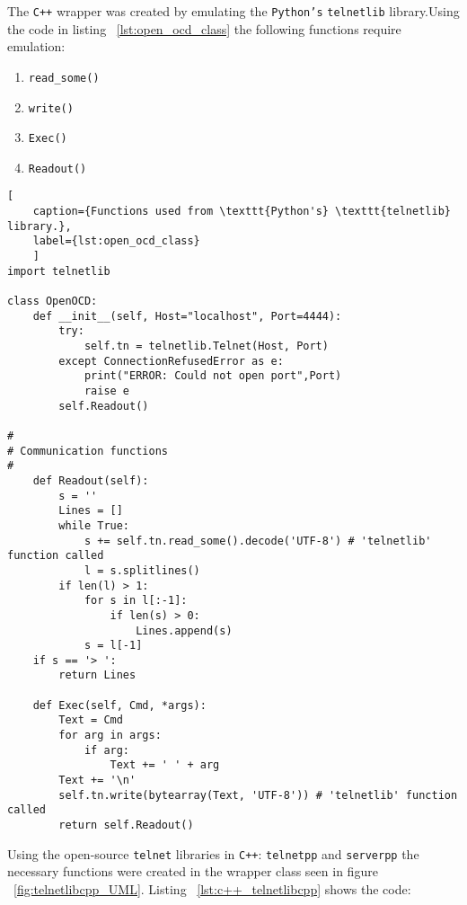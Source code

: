 The \texttt{C++} wrapper was created by emulating the \texttt{Python's} \texttt{telnetlib} library.Using the code in listing ~\ref{lst:open_ocd_class} the following functions require emulation:

\begin{enumerate}
	\item \texttt{read\_some()}
	\item \texttt{write()}
	\item \texttt{Exec()}
	\item \texttt{Readout()}
\end{enumerate}


\begin{lstlisting}[
	caption={Functions used from \texttt{Python's} \texttt{telnetlib} library.},
	label={lst:open_ocd_class}
	]
import telnetlib

class OpenOCD:
	def __init__(self, Host="localhost", Port=4444):
		try:
			self.tn = telnetlib.Telnet(Host, Port)
		except ConnectionRefusedError as e:
			print("ERROR: Could not open port",Port)
			raise e
		self.Readout()

#
# Communication functions
#
	def Readout(self):
		s = ''
		Lines = []
		while True:
			s += self.tn.read_some().decode('UTF-8') # 'telnetlib' function called
			l = s.splitlines()
		if len(l) > 1:
			for s in l[:-1]:
				if len(s) > 0:
					Lines.append(s)
			s = l[-1]
	if s == '> ':
		return Lines

	def Exec(self, Cmd, *args):
		Text = Cmd
		for arg in args:
			if arg:
				Text += ' ' + arg
		Text += '\n'
		self.tn.write(bytearray(Text, 'UTF-8')) # 'telnetlib' function called
		return self.Readout()
\end{lstlisting}

Using the open-source \texttt{telnet} libraries in \texttt{C++}: \texttt{telnetpp}\cite{telnetpp_library} and \texttt{serverpp}\cite{serverpp_library} the necessary functions were created in the wrapper class seen in figure ~\ref{fig:telnetlibcpp_UML}. Listing ~\ref{lst:c++_telnetlibcpp} shows the code:

